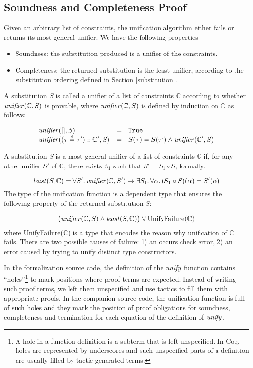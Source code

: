 \subsection{Soundness and Completeness Proof}\label{soundness}

Given an arbitrary list of constraints, the unification algorithm
either fails or returns its most general unifier. We have the
following properties:
\begin{itemize}
    \item Soundness: the substitution produced is a unifier of the constraints.

    \item Completeness: the returned substitution is the least
      unifier, according to the substitution ordering defined in
      Section \ref{substitution}.
\end{itemize}

A substitution $S$ is called a unifier of a list of constraints
$\mathbb{C}$ according to whether $\text{\it unifier\/}(\mathbb{C},S)$ is provable,
where $\text{\it unifier\/}(\mathbb{C},S)$ is defined by induction on $\mathbb{C}$
as follows:

\[ \begin{array}{lcl}
     \text{\it unifier\/}([],S)                             & = & \text{\tt True} \\
     \text{\it unifier\/}((\tau\overset{e}{=}\tau') :: \mathbb{C}',S) & = & S(\tau) = S(\tau') \land \text{\it unifier\/}(\mathbb{C}',S)
  \end{array} 
\]

\newcommand{\least}{\text{\it least\/}}

A substitution $S$ is a most general unifier of a list of constraints
$\mathbb{C}$ if, for any other unifier $S'$ of $\mathbb{C}$, there
exists $S_1$ such that $S' = S_1 \circ S$; formally:

\[
  \least(S,\mathbb{C}) = 
    \forall S'.\,\unifier(\mathbb{C},S') \to 
       \exists S_1.\, \forall \alpha.\,(S_1 \circ S)(\alpha) = S'(\alpha)
\]
The type of the unification function is a dependent type that ensures
the following property of the returned substitution $S$:

\[ \bigl(\unifier(\mathbb{C},S) \land 
    \least(S,\mathbb{C})\bigr) \lor \text{UnifyFailure($\mathbb{C}$)}
\]
where UnifyFailure($\mathbb{C}$) is a type that encodes the reason why
unification of $\mathbb{C}$ fails. There are two possible causes of
failure: 1) an occurs check error, 2) an error caused by trying to
unify distinct type constructors.

In the formalization source code, the definition of the $\text{\it unify\/}$ function
contains ``holes''\footnote{A
  hole in a function definition is a subterm that is left
  unspecified. In Coq, holes are represented by underscores and such
  unspecified parts of a definition are usually filled by tactic
  generated terms.} to mark positions where proof terms are
expected. Instead of writing such proof terms, we left them
unspecified and use tactics to fill them with appropriate proofs. In
the companion source code, the unification function is full of such
holes and they mark the position of proof obligations for soundness,
completeness and termination for each equation of the definition of
$\text{\it unify\/}$.

